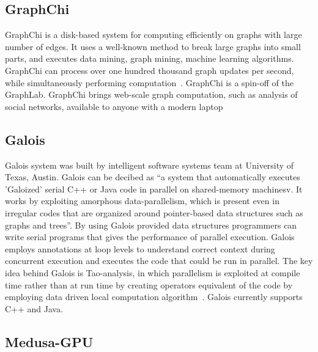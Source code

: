 \subsection{GraphChi}

GraphChi is a disk-based system for computing efficiently on graphs
with large number of edges.  It uses a well-known method to break
large graphs into small parts, and executes data mining, graph mining,
machine learning algorithms. GraphChi can process over one hundred
thousand graph updates per second, while simultaneously performing
computation~\cite{GraphChi}. GraphChi is a spin-off of the
GraphLab. GraphChi brings web-scale graph computation, such as
analysis of social networks, available to anyone with a modern laptop

     
\subsection{Galois}
     
Galois system was built by intelligent software systems team at
University of Texas, Austin. Galois can be decibed as ``a system that
automatically executes 'Galoized' serial C++ or Java code in
parallel on shared-memory machinesv\cite{www-galoisSite}. It works by
exploiting amorphous data-parallelism, which is present even in
irregular codes that are organized around pointer-based data
structures such as graphs and trees''. By using Galois provided data
structures programmers can write serial programs that gives the
performance of parallel execution. Galois employs annotations at loop
levels to understand correct context during concurrent execution and
executes the code that could be run in parallel. The key idea behind
Galois is Tao-analysis, in which parallelism is exploited at compile
time rather than at run time by creating operators equivalent of the
code by employing data driven local computation
algorithm~\cite{taoParallelismPaper}. Galois currently supports C++
and Java.

     \pv
	   
\subsection{Medusa-GPU}
     
